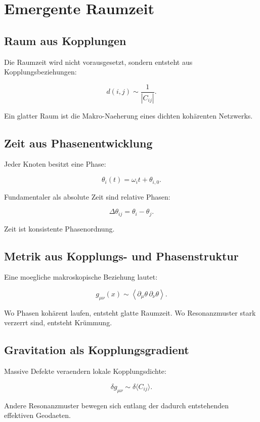 \documentclass[11pt,a4paper]{article}
\begin{document}
\section{Emergente Raumzeit}

\subsection{Raum aus Kopplungen}

Die Raumzeit wird nicht vorausgesetzt, sondern entsteht aus Kopplungsbeziehungen:

\[
d(i,j)\sim\frac{1}{|C_{ij}|}.
\]

Ein glatter Raum ist die Makro-Naeherung eines dichten kohärenten Netzwerks.

\subsection{Zeit aus Phasenentwicklung}

Jeder Knoten besitzt eine Phase:

\[
\theta_i(t)=\omega_it+\theta_{i,0}.
\]

Fundamentaler als absolute Zeit sind relative Phasen:

\[
\Delta\theta_{ij}=\theta_i-\theta_j.
\]

Zeit ist konsistente Phasenordnung.

\subsection{Metrik aus Kopplungs- und Phasenstruktur}

Eine moegliche makroskopische Beziehung lautet:

\[
g_{\mu\nu}(x)\sim
\left\langle
\partial_\mu\theta\,\partial_\nu\theta
\right\rangle.
\]

Wo Phasen kohärent laufen, entsteht glatte Raumzeit. Wo Resonanzmuster stark verzerrt sind, entsteht Krümmung.

\subsection{Gravitation als Kopplungsgradient}

Massive Defekte veraendern lokale Kopplungsdichte:

\[
\delta g_{\mu\nu}\sim \delta\langle C_{ij}\rangle.
\]

Andere Resonanzmuster bewegen sich entlang der dadurch entstehenden effektiven Geodaeten.
\end{document}
